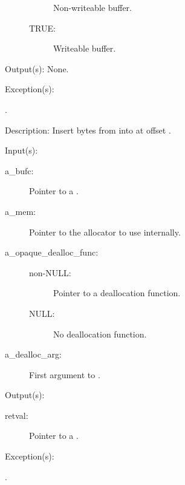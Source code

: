 \begin{capi}
\begin{capilist}
\begin{description}
\begin{description}
				Non-writeable buffer.
			\item[TRUE: ]
				Writeable buffer.
			\end{description}
		\end{description}
	\item[Output(s): ] None.
	\item[Exception(s): ]
		\begin{description}\item[]
		\item[.]
		\end{description}
	\item[Description: ]
		Insert  bytes from  into
		 at offset .
	\end{capilist}
\label{bufc_new}
	\begin{capilist}
	\item[Input(s): ]
		\begin{description}\item[]
		\item[a\_bufc: ]
			Pointer to a .
		\item[a\_mem: ]
			Pointer to the allocator to use internally.
		\item[a\_opaque\_dealloc\_func: ]
			\begin{description}\item[]
			\item[non-NULL: ] Pointer to a deallocation function.
			\item[NULL: ] No deallocation function.
			\end{description}
		\item[a\_dealloc\_arg: ]
			First argument to .
		\end{description}
	\item[Output(s): ]
		\begin{description}\item[]
		\item[retval: ]
			Pointer to a .
		\end{description}
	\item[Exception(s): ]
		\begin{description}\item[]
		\item[.]

\end{description}
\end{capilist}
\end{capi}
